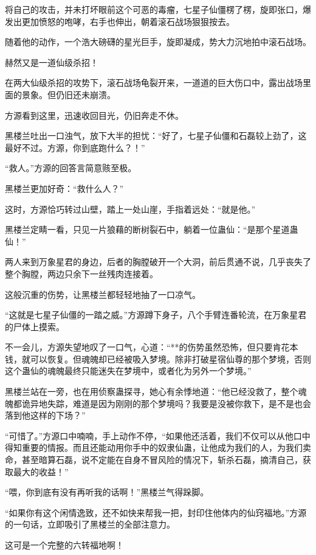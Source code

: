 
\begin{this_body}

将自己的攻击，并未打坏眼前这个可恶的毒瘤，七星子仙僵楞了楞，旋即张口，爆发出更加愤怒的咆哮，右手也伸出，朝着滚石战场狠狠按去。

随着他的动作，一个浩大磅礴的星光巨手，旋即凝成，势大力沉地拍中滚石战场。

赫然又是一道仙级杀招！

在两大仙级杀招的攻势下，滚石战场龟裂开来，一道道的巨大伤口中，露出战场里面的景象。但仍旧还未崩溃。

方源看到这里，迅速收回目光，仍旧奔走不休。

黑楼兰吐出一口浊气，放下大半的担忧：“好了，七星子仙僵和石磊较上劲了，这最好不过。方源，你到底跑什么？！”

“救人。”方源的回答言简意赅至极。

黑楼兰更加好奇：“救什么人？”

这时，方源恰巧转过山壁，踏上一处山崖，手指着远处：“就是他。”

黑楼兰定睛一看，只见一片狼藉的断树裂石中，躺着一位蛊仙：“是那个星道蛊仙！”

两人来到万象星君的身边，后者的胸膛破开一个大洞，前后贯通不说，几乎丧失了整个胸膛，两边只余下一丝残肉连接着。

这般沉重的伤势，让黑楼兰都轻轻地抽了一口凉气。

“这就是七星子仙僵的一踏之威。”方源蹲下身子，八个手臂连番轮流，在万象星君的尸体上摸索。

不一会儿，方源失望地叹了一口气，心道：“**的伤势虽然恐怖，但只要肯花本钱，就可以恢复。但魂魄却已经被吸入梦境。除非打破星宿仙尊的那个梦境，否则这个蛊仙的魂魄最终只能迷失在梦境中，或者化为另外一个梦境。”

黑楼兰站在一旁，也在用侦察蛊探寻，她心有余悸地道：“他已经没救了，整个魂魄都诡异地失踪，难道是因为刚刚的那个梦境吗？我要是没被你救下，是不是也会落到他这样的下场？”

“可惜了。”方源口中喃喃，手上动作不停，“如果他还活着，我们不仅可以从他口中得知重要的情报。而且还能动用你手中的奴隶仙蛊，让他成为我们的人，为我们卖命，甚至暗算石磊，说不定能在自身不冒风险的情况下，斩杀石磊，摘清自己，获取最大的收益！”

“喂，你到底有没有再听我的话啊！”黑楼兰气得跺脚。

“如果你有这个闲情逸致，还不如快来帮我一把，封印住他体内的仙窍福地。”方源的一句话，立即吸引了黑楼兰的全部注意力。

这可是一个完整的六转福地啊！


\end{this_body}
